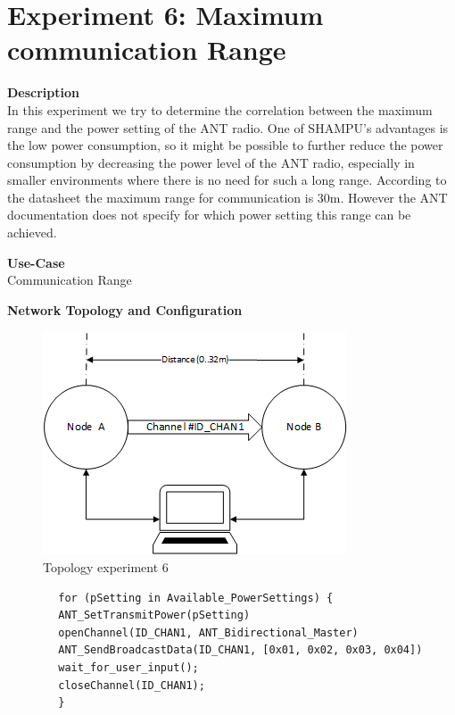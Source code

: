 \section{Experiment 6: Maximum communication Range}
\begin{description} 
	\item{\textbf{Description}} \hfill \\  In this experiment we try to determine the correlation between the maximum range and the power setting of the ANT radio. One of SHAMPU's advantages is the low power consumption, so it might be possible to further reduce the power consumption by decreasing the power level of the ANT radio, especially in smaller environments where there is no need for such a long range. According to the datasheet the maximum range for communication is 30m. However the ANT documentation does not specify for which power setting this range can be achieved. 
	
	\item{\textbf{Use-Case}} \hfill \\ Communication Range		
	\item{\textbf{Network Topology and Configuration}} \hfill \\ 
	\begin{figure}[H]
		\centering
		\includegraphics[scale=1]{content/images/exp6_topo.png}
		\caption{Topology experiment 6}
	\end{figure}
	
	\begin{code}[H]
		\begin{verbatim}
		for (pSetting in Available_PowerSettings) {
		ANT_SetTransmitPower(pSetting)
		openChannel(ID_CHAN1, ANT_Bidirectional_Master)
		ANT_SendBroadcastData(ID_CHAN1, [0x01, 0x02, 0x03, 0x04])
		wait_for_user_input();
		closeChannel(ID_CHAN1);
		}
		\end{verbatim}
		\caption{maximum communication range (Master)}\label{lst:mExp6}
	\end{code}
	

\end{description}

